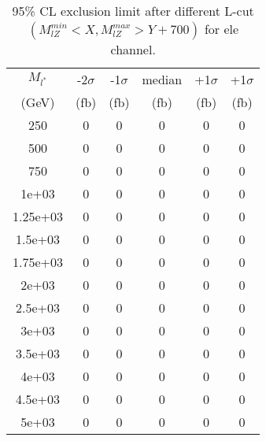 \documentclass[]{article}
\begin{document}
\begin{table}
\begin{center}
\begin{tabular}{cccccc}
\hline 
\hline 
$M_{l^*}$ & -2$\sigma$ & -1$\sigma$ & median & +1$\sigma$ & +1$\sigma$\\ 
(GeV) & (fb) & (fb) & (fb) & (fb) & (fb)  \\ 
\hline 
\hline 
250 & 0 & 0 & 0 & 0 & 0\\
500 & 0 & 0 & 0 & 0 & 0\\
750 & 0 & 0 & 0 & 0 & 0\\
1e+03 & 0 & 0 & 0 & 0 & 0\\
1.25e+03 & 0 & 0 & 0 & 0 & 0\\
1.5e+03 & 0 & 0 & 0 & 0 & 0\\
1.75e+03 & 0 & 0 & 0 & 0 & 0\\
2e+03 & 0 & 0 & 0 & 0 & 0\\
2.5e+03 & 0 & 0 & 0 & 0 & 0\\
3e+03 & 0 & 0 & 0 & 0 & 0\\
3.5e+03 & 0 & 0 & 0 & 0 & 0\\
4e+03 & 0 & 0 & 0 & 0 & 0\\
4.5e+03 & 0 & 0 & 0 & 0 & 0\\
5e+03 & 0 & 0 & 0 & 0 & 0\\
\hline 
\end{tabular}
\caption{95\% CL exclusion limit after different L-cut $(M_{lZ}^{min} < X, M_{lZ}^{max} > Y + 700)$ for ele channel.}
\label{tab:limit_electron}
\end{center}
\end{table}
\end{document}
